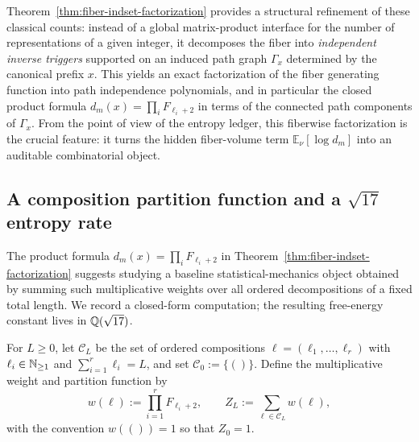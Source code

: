 Theorem~\ref{thm:fiber-indset-factorization} provides a structural refinement of these classical counts:
instead of a global matrix-product interface for the number of representations of a given integer, it decomposes the fiber into \emph{independent inverse triggers} supported on an induced path graph $\Gamma_x$ determined by the canonical prefix $x$.
This yields an exact factorization of the fiber generating function into path independence polynomials, and in particular the closed product formula
\(
d_m(x)=\prod_i F_{\ell_i+2}
\)
in terms of the connected path components of $\Gamma_x$.
From the point of view of the entropy ledger, this fiberwise factorization is the crucial feature: it turns the hidden fiber-volume term $\mathbb{E}_\nu[\log d_m]$ into an auditable combinatorial object.

\subsection{A composition partition function and a \texorpdfstring{$\sqrt{17}$}{sqrt(17)} entropy rate}\label{app:fiber-sqrt17-partition}
The product formula $d_m(x)=\prod_i F_{\ell_i+2}$ in Theorem~\ref{thm:fiber-indset-factorization} suggests studying a baseline statistical-mechanics object obtained by summing such multiplicative weights over all ordered decompositions of a fixed total length.
We record a closed-form computation; the resulting free-energy constant lives in $\mathbb{Q}(\sqrt{17})$.

\begin{definition}\label{def:composition-partition}
For $L\ge 0$, let $\mathcal{C}_L$ be the set of ordered compositions $\boldsymbol{\ell}=(\ell_1,\dots,\ell_r)$ with $\ell_i\in\mathbb{N}_{\ge 1}$ and $\sum_{i=1}^r \ell_i=L$, and set $\mathcal{C}_0:=\{()\}$.
Define the multiplicative weight and partition function by
\[
w(\boldsymbol{\ell}):=\prod_{i=1}^r F_{\ell_i+2},
\qquad
Z_L:=\sum_{\boldsymbol{\ell}\in\mathcal{C}_L} w(\boldsymbol{\ell}),
\]
with the convention $w(())=1$ so that $Z_0=1$.
\end{definition}

